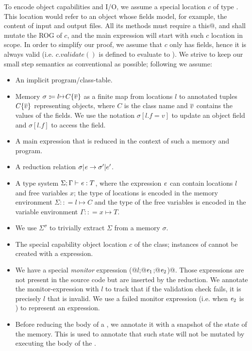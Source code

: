 To encode object capabilities and I/O, we assume a special location
$c$ of type \Q@Cap@.
This location would refer to an object whose fields model, for example, the content of input and output files.
All its methods must require a \Q@mut this@, and shall mutate the ROG of $c$, and the main expression will start with
such $c$ location in scope. In order to simplify our proof, we assume that $c$ only has \Q@mut@ fields, hence it is always valid (i.e. $c.validate()$ is defined to evaluate to \Q@true@).
We strive to keep our small step semantics as conventional as possible; following  we assume:
\begin{itemize}
\item An implicit program/class-table.
\item Memory $\sigma:\!:\!= l\mapsto C\{\Many{v}\}$ as a finite map from locations $l$ to annotated tuples $C\{\hspace{0.03ex} \overline{\hspace{-0.03ex}v\hspace{-0.03ex}} \hspace{0.03ex}\}$ representing objects,
where $C$ is the class name and $\hspace{0.03ex} \overline{\hspace{-0.03ex}v\hspace{-0.03ex}} \hspace{0.03ex}$ contains the values of the fields.
We use the notation $\sigma[l.f=v]$ to update an object field and $\sigma[l.f]$ to access the field.
\item A main expression that is reduced in the context of such a memory and program.
\item A reduction relation $\sigma|\e\rightarrow \sigma'|e'$.
\item A type system $\Sigma;\Gamma\vdash\e:T$, where 
the expression ${\mathit{e}}$ can contain locations $l$ and free variables $x$;
the type of locations is encoded in the memory environment $\Sigma:\!:\!= l\mapsto C$
and the type of the free variables is encoded in the variable environment $\Gamma:\!:\!= x\mapsto T$.
\item We use $\Sigma^\sigma$ to trivially extract $\Sigma$ from a memory $\sigma$.
\item The special capability object location $c$ of the \Q@Cap@ class; instances of \Q@Cap@ cannot be created with a \Q@new@ expression.
\item We have a special \emph{monitor} expression \Q@M(@$l$\Q@;@${\mathit{e}}_1$\Q@;@${\mathit{e}}_2$\Q@)@.
Those expressions are not present in the source code but are inserted by the reduction.
 We annotate the monitor-expression with $l$ to track
that if the validation check fails, it is precisely $l$ that is invalid.
We use a failed monitor expression (i.e. when ${\mathit{e}}_2$ is \Q@false@) to represent an \Q@error@ expression.
\item Before reducing the body of a \Q@try@, we annotate it with a snapshot of 
the state of the memory. This is used to annotate that such state will not be mutated by executing the body of the \Q@try@.
\end{itemize}

